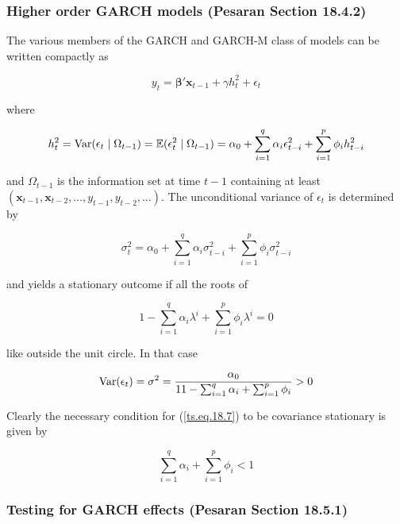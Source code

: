 \subsubsection{Higher order GARCH models (Pesaran Section 18.4.2)} The various members of the GARCH and GARCH-M class of models can be written compactly as

\begin{equation} \label{ts.eq.18.6}
y_t = \boldsymbol{\beta}' \boldsymbol{x}_{t-1} + \gamma h_t^2 + \epsilon_t
\end{equation}

where

\begin{equation} \label{ts.eq.18.7}
h_t^2 = \mathrm{Var}(\epsilon_t \mid \Omega_{t-1}) = \mathbb{E}(\epsilon_t^2 \mid \Omega_{t-1}) = \alpha_0 + \sum_{i=1}^q \alpha_i \epsilon_{t-i}^2 + \sum_{i=1}^p \phi_i h_{t-i}^2
\end{equation}

and \(\Omega_{t-1}\) is the information set at time \(t - 1\) containing at least \((\boldsymbol{x}_{t-1}, \boldsymbol{x}_{t-2}, \ldots, y_{t-1}, y_{t-2}, \ldots)\). The unconditional variance of \(\epsilon_t\) is determined by 

\[
\sigma_t^2 = \alpha_0 + \sum_{i=1}^q \alpha_i \sigma_{t-i}^2 + \sum_{i=1}^p \phi_i \sigma_{t-i}^2
\]

and yields a stationary outcome if all the roots of

\[
1 - \sum_{i=1}^q \alpha_i \lambda^i + \sum_{i=1}^p \phi_i \lambda^i = 0
\]

like outside the unit circle. In that case

\begin{equation} \label{ts.eq.18.8}
\mathrm{Var}(\epsilon_t) = \sigma^2 = \frac{\alpha_0}{1 1 - \sum_{i=1}^q \alpha_i + \sum_{i=1}^p \phi_i } > 0
\end{equation}

Clearly the necessary condition for (\ref{ts.eq.18.7}) to be covariance stationary is given by

\[
\sum_{i=1}^q \alpha_i + \sum_{i=1}^p \phi_i < 1
\]

\subsubsection{Testing for GARCH effects (Pesaran Section 18.5.1)} \label{ts.pesaran.18.5.1}

